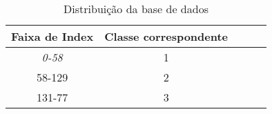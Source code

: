 \begin{table}[H]
\centering
\caption{Distribuição da base de dados}
\begin{tabular}{ccccc}
\hline

\multicolumn{1}{l}{Faixa de Index} & \multicolumn{1}{l}{Classe correspondente} \\ \hline
\textit{0-58}                      & 1                                         \\
58-129                             & 2                                         \\
131-77                             & 3                                         \\ \hline
\end{tabular}%

\label{tabela:baseDados}

\end{table}
